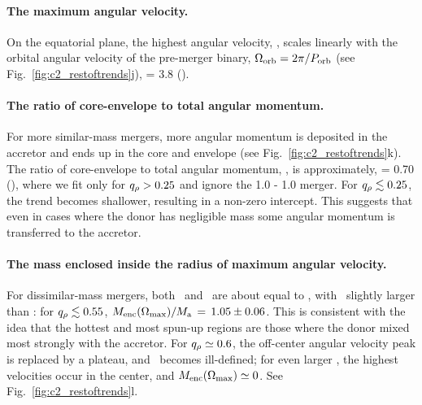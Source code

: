 \paragraph{The maximum angular velocity.}  On the equatorial plane, the highest angular velocity, \Omegamax, scales linearly with the orbital angular velocity of the pre-merger binary, $\Omegaorb = 2\pi/P_\mrm{orb}$ (see Fig.~\ref{fig:c2_restoftrends}j),
\eqbegin
\frac{\Omegamax}{\Omegaorb} = 3.8
\qquad().
\eqend

\paragraph{The ratio of core-envelope to total angular momentum.} For more similar-mass mergers, more angular momentum is deposited in the accretor and ends up in the core and envelope (see Fig.~\ref{fig:c2_restoftrends}k).  The ratio of core-envelope to total angular momentum, \Lrat, is approximately,
\eqbegin
{} = 0.70\qrho
\qquad(),
\eqend
where we fit only for $\qrho > 0.25$ and ignore the 1.0 - 1.0 {\Msun} merger.  For $\qrho\lesssim0.25$, the trend becomes shallower, resulting in a non-zero intercept.  This suggests that even in cases where the donor has negligible mass some angular momentum is transferred to the accretor.

\paragraph{The mass enclosed inside the radius of maximum angular velocity.}  
For dissimilar-mass mergers, both \MencOmax\ and \MencTmax\ are about equal to \Ma, with \MencOmax\ slightly larger than \MencTmax: for $\qrho\lesssim0.55$, $\MencOmax/\Ma\,=\,1.05\pm0.06$.  This is consistent with the idea that the hottest and most spun-up regions are those where the donor mixed most strongly with the accretor.  For $\qrho\simeq0.6$, the off-center angular velocity peak is replaced by a plateau, and \MencOmax\ becomes ill-defined; for even larger \qrho, the highest velocities occur in the center, and $\MencOmax\simeq0$.  See Fig.~\ref{fig:c2_restoftrends}l.

